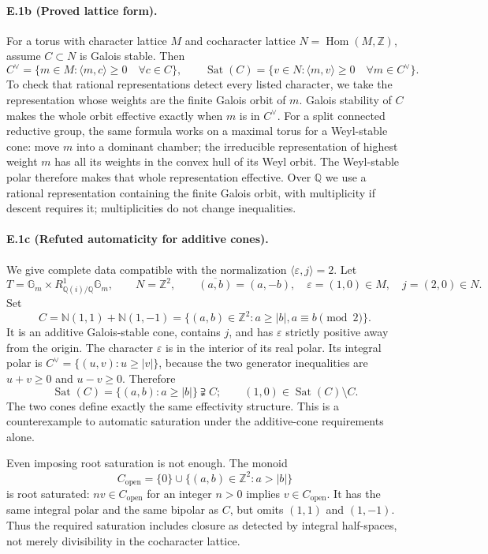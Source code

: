 \paragraph{E.1b (Proved lattice form).}
For a torus with character lattice $M$ and cocharacter lattice
$N=\operatorname{Hom}(M,\mathbb Z)$, assume $C\subset N$ is Galois
stable. Then
\[
 C^\vee=\{m\in M:\langle m,c\rangle\ge0\quad\forall c\in C\},
 \qquad
 \operatorname{Sat}(C)=
 \{v\in N:\langle m,v\rangle\ge0\quad\forall m\in C^\vee\}.
\]
To check that rational representations detect every listed character,
we take the representation whose weights are the finite Galois orbit
of $m$. Galois stability of $C$ makes the whole orbit effective
exactly when $m$ is in $C^\vee$. For a split connected reductive group,
the same formula works on a maximal torus for a Weyl-stable cone:
move $m$ into a dominant chamber; the irreducible representation of
highest weight $m$ has all its weights in the convex hull of its Weyl
orbit. The Weyl-stable polar therefore makes that whole representation
effective. Over $\mathbb Q$ we use a rational representation containing
the finite Galois orbit, with multiplicity if descent requires it;
multiplicities do not change inequalities.

\paragraph{E.1c (Refuted automaticity for additive cones).}
We give complete data compatible with the normalization
$\langle\varepsilon,j\rangle=2$. Let
\[
 T=\mathbb G_m\times R^1_{\mathbb Q(i)/\mathbb Q}\mathbb G_m,
 \qquad N=\mathbb Z^2,
 \qquad \overline{(a,b)}=(a,-b),
 \quad \varepsilon=(1,0)\in M,
 \quad j=(2,0)\in N.
\]
Set
\[
 C=\mathbb N(1,1)+\mathbb N(1,-1)
   =\{(a,b)\in\mathbb Z^2:a\ge |b|, a\equiv b\pmod2\}.
\]
It is an additive Galois-stable cone, contains $j$, and has
$\varepsilon$ strictly positive away from the origin.
The character $\varepsilon$ is in the interior of its real polar.
Its integral polar is
$C^\vee=\{(u,v):u\ge|v|\}$, because the two generator inequalities
are $u+v\ge0$ and $u-v\ge0$. Therefore
\[
 \operatorname{Sat}(C)=\{(a,b):a\ge|b|\}\supsetneqq C;
 \qquad (1,0)\in\operatorname{Sat}(C)\setminus C.
\]
The two cones define exactly the same effectivity structure. This
is a counterexample to automatic saturation under the additive-cone
requirements alone.

Even imposing root saturation is not enough. The monoid
\[
 C_{\mathrm{open}}=\{0\}\cup
     \{(a,b)\in\mathbb Z^2:a>|b|\}
\]
is root saturated: $nv\in C_{\mathrm{open}}$ for an integer $n>0$
implies $v\in C_{\mathrm{open}}$. It has the same integral polar and
the same bipolar as $C$, but omits $(1,1)$ and $(1,-1)$. Thus the
required saturation includes closure as detected by integral
half-spaces, not merely divisibility in the cocharacter lattice.

